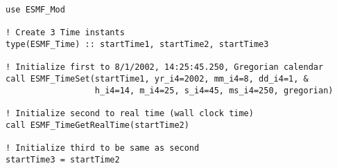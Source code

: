 
\begin{verbatim}
use ESMF_Mod

! Create 3 Time instants
type(ESMF_Time) :: startTime1, startTime2, startTime3

! Initialize first to 8/1/2002, 14:25:45.250, Gregorian calendar
call ESMF_TimeSet(startTime1, yr_i4=2002, mm_i4=8, dd_i4=1, &
                  h_i4=14, m_i4=25, s_i4=45, ms_i4=250, gregorian)

! Initialize second to real time (wall clock time)
call ESMF_TimeGetRealTime(startTime2)

! Initialize third to be same as second
startTime3 = startTime2

\end{verbatim}
